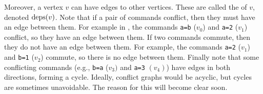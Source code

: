 %
Moreover, a vertex $v$ can have  edges to other
vertices. These are called the  of $v$, denoted
$\text{deps}(v)$. 
Note that if a pair of commands conflict, then they must have an edge between
them.  For example in , the commands
\texttt{a=b} ($v_0$) and \texttt{a=2} ($v_1$) conflict, so they have an edge
between them. If two commands commute, then they do not have an edge between
them.  For example, the commands \texttt{a=2} ($v_1$) and \texttt{b=1} ($v_2$)
commute, so there is no edge between them. Finally note that some conflicting
commands (e.g., \texttt{b=a} ($v_3)$ and \texttt{a=3} $(v_4)$) have edges in
both directions, forming a cycle. Ideally, conflict graphs would be acyclic,
but cycles are sometimes unavoidable. The reason for this will become clear
soon.


{}

